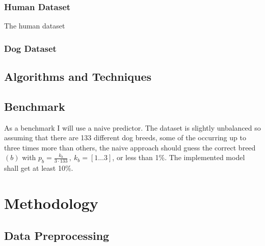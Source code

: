 \documentclass[paper=A4, DIV=calc, parskip=half]{scrartcl}
\begin{document}
\subsubsection*{Human Dataset}

The human dataset 


\subsubsection*{Dog Dataset}

\subsection*{Algorithms and Techniques}


\subsection*{Benchmark}

As a benchmark I will use a naive predictor. The dataset is slightly unbalanced so
assuming that there are 133 different dog breeds, some of the occurring up to three times
more than others, the naive approach should guess the correct breed $(b)$ with
$p_{b}=\frac{k_{b}}{3\cdot133}\,,\:k_{b}=\left[1\ldots3\right]$, or less than 1\%. The
implemented model shall get at least 10\%.


\section*{Methodology}

\subsection*{Data Preprocessing}

\end{document}
